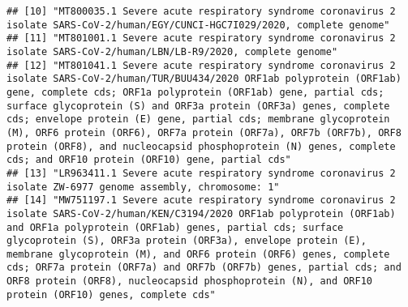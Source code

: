 \documentclass[
]{article}
\begin{document}
\begin{verbatim}
## [10] "MT800035.1 Severe acute respiratory syndrome coronavirus 2 isolate SARS-CoV-2/human/EGY/CUNCI-HGC7I029/2020, complete genome"                                                                                                                                                                                                                                                                                                                                                                                                     
## [11] "MT801001.1 Severe acute respiratory syndrome coronavirus 2 isolate SARS-CoV-2/human/LBN/LB-R9/2020, complete genome"                                                                                                                                                                                                                                                                                                                                                                                                              
## [12] "MT801041.1 Severe acute respiratory syndrome coronavirus 2 isolate SARS-CoV-2/human/TUR/BUU434/2020 ORF1ab polyprotein (ORF1ab) gene, complete cds; ORF1a polyprotein (ORF1ab) gene, partial cds; surface glycoprotein (S) and ORF3a protein (ORF3a) genes, complete cds; envelope protein (E) gene, partial cds; membrane glycoprotein (M), ORF6 protein (ORF6), ORF7a protein (ORF7a), ORF7b (ORF7b), ORF8 protein (ORF8), and nucleocapsid phosphoprotein (N) genes, complete cds; and ORF10 protein (ORF10) gene, partial cds"
## [13] "LR963411.1 Severe acute respiratory syndrome coronavirus 2 isolate ZW-6977 genome assembly, chromosome: 1"                                                                                                                                                                                                                                                                                                                                                                                                                        
## [14] "MW751197.1 Severe acute respiratory syndrome coronavirus 2 isolate SARS-CoV-2/human/KEN/C3194/2020 ORF1ab polyprotein (ORF1ab) and ORF1a polyprotein (ORF1ab) genes, partial cds; surface glycoprotein (S), ORF3a protein (ORF3a), envelope protein (E), membrane glycoprotein (M), and ORF6 protein (ORF6) genes, complete cds; ORF7a protein (ORF7a) and ORF7b (ORF7b) genes, partial cds; and ORF8 protein (ORF8), nucleocapsid phosphoprotein (N), and ORF10 protein (ORF10) genes, complete cds"                             

\end{verbatim}
\end{document}
